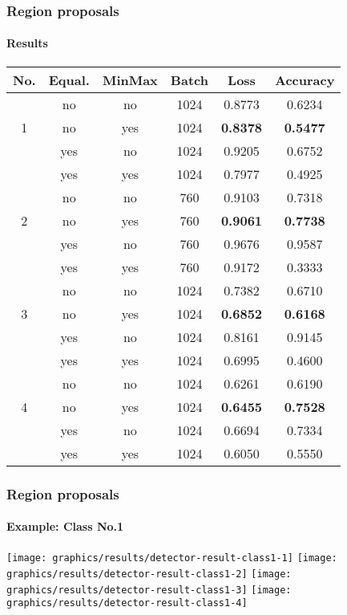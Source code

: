 \begin{frame}
    \frametitle{Region proposals}
    \framesubtitle{Results}
    \vskip -0.5cm
	\begin{table}
		\centering
		\small	
		\begin{tabular}{|c|c|c|c|c|c|}
			\hline		
			\textbf{No.} & \textbf{Equal.} & \textbf{MinMax} & \textbf{Batch} & \textbf{Loss} & \textbf{Accuracy}\\ \hline
			\multirow{3}{*}{1} & no & no & 1024 & 0.8773 & 0.6234 \\
			& no & yes & 1024 & \textbf{0.8378} & \textbf{0.5477} \\
			& yes & no & 1024 & 0.9205 & 0.6752 \\
			& yes & yes & 1024 & 0.7977 & 0.4925 \\ \hline
			\multirow{3}{*}{2} & no & no & 760 & 0.9103 & 0.7318\\
			& no & yes & 760 & \textbf{0.9061} & \textbf{0.7738} \\
			& yes & no & 760 & 0.9676 & 0.9587 \\
			& yes & yes & 760 & 0.9172 & 0.3333 \\ \hline
			\multirow{3}{*}{3} & no & no & 1024 & 0.7382 & 0.6710 \\
			& no & yes & 1024 & \textbf{0.6852} & \textbf{0.6168} \\
			& yes & no & 1024 & 0.8161 & 0.9145 \\
			& yes & yes & 1024 & 0.6995 & 0.4600 \\ \hline
			\multirow{3}{*}{4} & no & no & 1024 & 0.6261 & 0.6190 \\
			& no & yes & 1024 & \textbf{0.6455} & \textbf{0.7528} \\
			& yes & no & 1024 & 0.6694 & 0.7334 \\
			& yes & yes & 1024 & 0.6050 & 0.5550 \\ \hline
		\end{tabular}
	\end{table}
\end{frame}

\begin{frame}
	\frametitle{Region proposals}
	\framesubtitle{Example: Class No.1}
     {
		\texttt{[image: graphics/results/detector-result-class1-1]}
	}
	\only<2-4> {
		\texttt{[image: graphics/results/detector-result-class1-2]}
	}
	\only<3-4> {
		\texttt{[image: graphics/results/detector-result-class1-3]}
	}
	\only<4> {
		\texttt{[image: graphics/results/detector-result-class1-4]}
	}
\end{frame}

